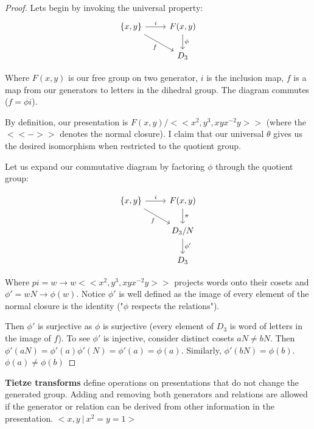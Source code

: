 \documentclass[10pt]{article}
\begin{document}
\begin{proof}

	Lets begin by invoking the universal property:
	\[
	\begin{tikzcd}
	{\{x, y\}} \arrow[rd, "f"'] \arrow[r, "i"] & {F(x, y)} \arrow[d, "\phi"] \\
																						 & D_3                        
	\end{tikzcd}
	\]

	Where $F(x, y)$ is our free group on two generator, $i$ is the inclusion map,
	$f$ is a map from our generators to letters in the dihedral group. The
	diagram commutes ($f = \phi i$).

	By definition, our presentation is $F(x, y) / << x^2, y^3, xyx^{-2}y >>$
	(where the $<<->>$ denotes the normal closure). I claim that our universal
	$\theta$ gives us the desired isomorphism when restricted to the quotient
	group.

	Let us expand our commutative diagram by factoring $\phi$ through the
	quotient group:

	\[
	\begin{tikzcd}
	{\{x, y\}} \arrow[rd, "f"'] \arrow[r, "i"] & {F(x, y)} \arrow[d, "\pi"]   \\
																						 & D_3 / N \arrow[d, "\phi'"] \\
																						 & D_3                         
	\end{tikzcd}
	\]

	Where $pi = w \to w << x^2, y^3, xyx^{-2}y >>$ projects words onto
	their cosets and $\phi' = wN \to \phi(w)$. Notice $\phi'$ is well defined as
	the image of every element of the normal closure is the identity ("$\phi$
	respects the relations").

	Then $\phi'$ is surjective as $\phi$ is surjective (every element of $D_3$ is
	word of letters in the image of $f$). To see $\phi'$ is injective, consider
	distinct cosets $aN \neq bN$. Then $\phi'(aN) = \phi'(a)\phi'(N) = \phi'(a) =
	\phi(a)$. Similarly, $\phi'(bN) = \phi(b)$. $\phi(a) \neq \phi(b)$

\end{proof}


\begin{note}
	\textbf{Tietze transforms} define operations on presentations that do not
	change the generated group. Adding and removing both generators and relations
	are allowed if the generator or relation can be derived from other
	information in the presentation.
	$< x, y ~|~ x^2 = y = 1>$
\end{note}
\end{document}
